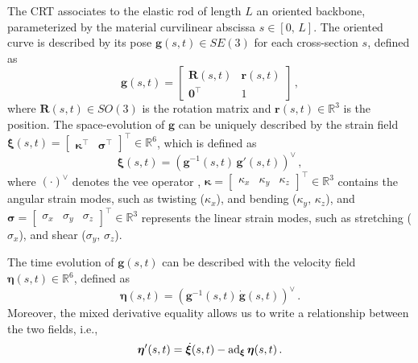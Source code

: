 The \ac{CRT} associates to the elastic rod of length $L$ an oriented backbone, parameterized by the material curvilinear abscissa $s \in [0, \, L]$. The oriented curve is described by its pose $\bm{g}(s, t) \in SE(3)$ for each cross-section $s$, defined as
\begin{equation} \label{eq:se3_definition}
    \bm{g}(s, t) = \begin{bmatrix}
                \bm{R}(s, t) & \bm{r}(s, t) \\
                \bm{0}^{\top} & 1 
        \end{bmatrix} \, ,
\end{equation}
where $\bm{R}(s, t) \in SO(3)$ is the rotation matrix and $\bm{r}(s, t) \in \mathbb{R}^{3}$ is the position.
The space-evolution of $\bm{g}$ can be uniquely described by the strain field $\bm{\xi}(s, t) = \begin{bmatrix} \bm{\kappa}^{\top} & \bm{\sigma}^{\top} \end{bmatrix}^{\top} \in \mathbb{R}^6$, which is defined as
\begin{equation} \label{eq:strain_field}
    \bm{\xi}(s, t) = \left(\bm{g}^{-1}(s, t) \, \bm{g}'(s, t)\right)^{\vee} \, ,
\end{equation}
where ${\left(\cdot\right)}^{\vee}$ denotes the vee operator \cite[Ch.\ 3]{murray}, $\bm{\kappa} = \begin{bmatrix}
    \kappa_x & \kappa_y & \kappa_z
\end{bmatrix}^{\top} \in \mathbb{R}^{3}$ contains the angular strain modes, such as twisting ($\kappa_x$), and bending ($\kappa_y , \, \kappa_z$), and $\bm{\sigma} = \begin{bmatrix}
    \sigma_x & \sigma_y & \sigma_z
\end{bmatrix}^{\top} \in \mathbb{R}^{3}$ represents the linear strain modes, such as stretching ($\sigma_x$), and shear ($\sigma_y, \, \sigma_z$).

The time evolution of $\bm{g}(s, t)$ can be described with the velocity field $\bm{\eta}(s, t) \in \mathbb{R}^6$, defined as
\begin{equation} \label{eq:velocity_field}
    \bm{\eta}(s, t) = \left(\bm{g}^{-1}(s, t) \, \dot{\bm{g}}(s, t)\right)^{\vee} \, .
\end{equation}
Moreover, the mixed derivative equality allows us to write a relationship between the two fields, i.e.,
\begin{equation} \label{eq:mixed_derivative}
    \bm{\eta}'(s, t) = \dot{\bm{\xi}}(s, t) - \textnormal{ad}_{\bm{\xi}} \, \bm{\eta}(s, t) \, . 
\end{equation}

